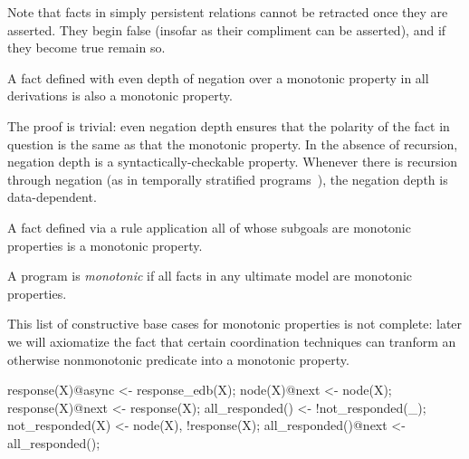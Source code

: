Note that facts in simply persistent relations cannot be retracted once they are asserted.  They begin false
(insofar as their compliment can be asserted), and if they become true remain so.

\begin{definition}
A fact defined with even depth of negation over a monotonic property in all derivations is also a monotonic property. 
\end{definition}

The proof is trivial: even negation depth ensures that the polarity of the fact in question is the
same as that the monotonic property.  In the absence of recursion, negation depth is a syntactically-checkable property.  Whenever there is recursion through negation
(as in temporally stratified \lang programs~\cite{dedalus}), the negation depth is data-dependent.

\begin{definition}
A fact defined via a rule application all of whose subgoals are monotonic properties is a
monotonic property.
\end{definition}

\begin{definition}
A \lang program is {\em monotonic} if all facts in any ultimate model are monotonic properties.
\end{definition}

This list of constructive base cases for monotonic properties is not complete: later we will
axiomatize the fact that certain coordination techniques can tranform an otherwise 
nonmonotonic predicate into a monotonic property.

\begin{example}
\begin{Dedalus}
response(X)@async <- response_edb(X);
node(X)@next <- node(X);
response(X)@next <- response(X);
all_responded() <- !not_responded(_);
not_responded(X) <- node(X), !response(X);
all_responded()@next <- all_responded();
\end{Dedalus}
\end{example}

